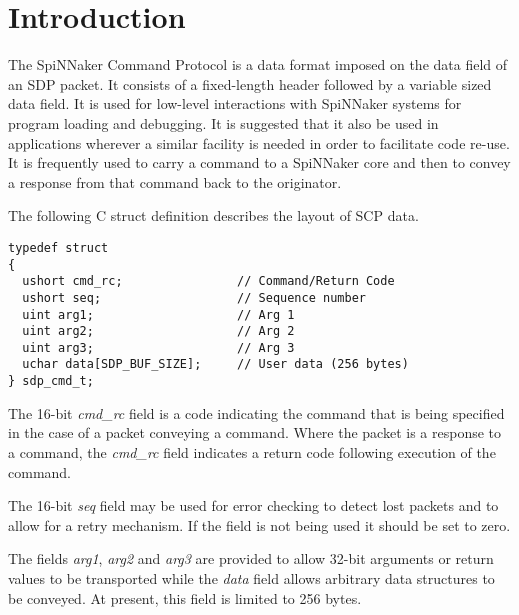 
\def\NoteNum{5}
\def\FullTitle{Spinnaker Command Protocol (SCP) Specification}
\def\ShortTitle{SCP Specification}
\def\Date{16 Mar 2016}
\def\Version{2.0.0}
\def\Author{Steve Temple}
\def\Email{steven.temple@manchester.ac.uk}



\section{Introduction}

The SpiNNaker Command Protocol is a data format imposed on the data
field of an SDP packet. It consists of a fixed-length header followed
by a variable sized data field. It is used for low-level interactions
with SpiNNaker systems for program loading and debugging. It is
suggested that it also be used in applications wherever a similar
facility is needed in order to facilitate code re-use. It is
frequently used to carry a command to a SpiNNaker core and then to
convey a response from that command back to the originator.

The following C struct definition describes the layout of SCP data.

\lstset{language=C}
\begin{lstlisting}
typedef struct
{
  ushort cmd_rc;                // Command/Return Code
  ushort seq;                   // Sequence number
  uint arg1;                    // Arg 1
  uint arg2;                    // Arg 2
  uint arg3;                    // Arg 3
  uchar data[SDP_BUF_SIZE];     // User data (256 bytes)
} sdp_cmd_t;
\end{lstlisting}


The 16-bit {\em cmd\_rc} field is a code indicating the command that
is being specified in the case of a packet conveying a command. Where
the packet is a response to a command, the {\em cmd\_rc} field
indicates a return code following execution of the command.

The 16-bit {\em seq} field may be used for error checking to detect
lost packets and to allow for a retry mechanism. If the field is not
being used it should be set to zero.

The fields {\em arg1}, {\em arg2} and {\em arg3} are provided to allow
32-bit arguments or return values to be transported while the {\em
data} field allows arbitrary data structures to be conveyed. At
present, this field is limited to 256 bytes.


